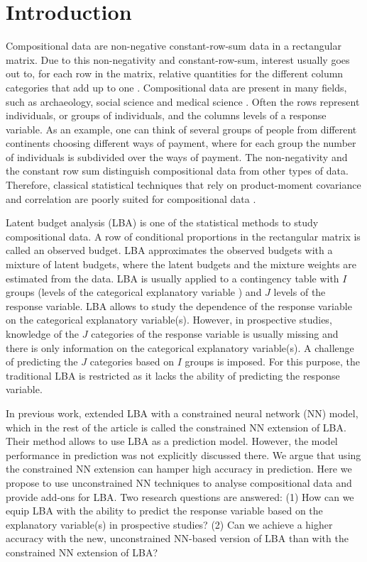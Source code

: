 \documentclass[]{interact}
\theoremstyle{plain}%
\theoremstyle{definition}
\theoremstyle{remark}
\begin{document}
\hypertarget{introduction}{%
\section{Introduction}\label{introduction}}

Compositional data are non-negative constant-row-sum data in a
rectangular matrix. Due to this non-negativity and constant-row-sum,
interest usually goes out to, for each row in the matrix, relative
quantities for the different column categories that add up to one
\citep{PG2006}. Compositional data are present in many fields, such as
archaeology, social science and medical science
\citep{Aitchison1994, Aitchison2008, baxter2006, PG2017, raun2016}.
Often the rows represent individuals, or groups of individuals, and the
columns levels of a response variable. As an example, one can think of
several groups of people from different continents choosing different
ways of payment, where for each group the number of individuals is
subdivided over the ways of payment. The non-negativity and the constant
row sum distinguish compositional data from other types of data.
Therefore, classical statistical techniques that rely on product-moment
covariance and correlation are poorly suited for compositional data
\citep{Aitchison1994, Aitchison2008}.

Latent budget analysis (LBA) \citep{Heijden1992} is one of the
statistical methods to study compositional data. A row of conditional
proportions in the rectangular matrix is called an observed budget. LBA
approximates the observed budgets with a mixture of latent budgets,
where the latent budgets and the mixture weights are estimated from the
data. LBA is usually applied to a contingency table with \(I\) groups
(levels of the categorical explanatory variable ) and \(J\) levels of
the response variable. LBA allows to study the dependence of the
response variable on the categorical explanatory variable(s). However,
in prospective studies, knowledge of the \(J\) categories of the
response variable is usually missing and there is only information on
the categorical explanatory variable(s). A challenge of predicting the
\(J\) categories based on \(I\) groups is imposed. For this purpose, the
traditional LBA is restricted as it lacks the ability of predicting the
response variable.

In previous work, \cite{SM2001} extended LBA with a constrained neural
network (NN) model, which in the rest of the article is called the
constrained NN extension of LBA. Their method allows to use LBA as a
prediction model. However, the model performance in prediction was not
explicitly discussed there. We argue that using the constrained NN
extension can hamper high accuracy in prediction. Here we propose to use
unconstrained NN techniques to analyse compositional data and provide
add-ons for LBA. Two research questions are answered: (1) How can we
equip LBA with the ability to predict the response variable based on the
explanatory variable(s) in prospective studies? (2) Can we achieve a
higher accuracy with the new, unconstrained NN-based version of LBA than
with the constrained NN extension of LBA?
\end{document}
